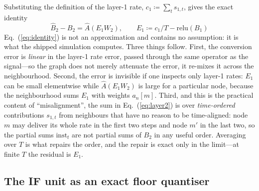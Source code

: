 \documentclass[10pt,twocolumn]{article}
\newcommand{\Ahat}{\hat{A}}
\newcommand{\Bone}{B_{1}}
\newcommand{\Btwo}{B_{2}}
\newcommand{\Btwohat}{\hat{B}_{2}}
\newcommand{\Eone}{E_{1}}
\newcommand{\cntone}{c_{1}}
\newcommand{\eqnref}[1]{Eq.~(\ref{#1})}
\begin{document}
Substituting the definition of the layer-1 rate, $\cntone \coloneqq \sum_{t} s_{1,t}$, gives the
exact identity
\begin{equation}
\boxed{\;\Btwohat - \Btwo = \Ahat\left(\Eone W_{2}\right),
\qquad \Eone \coloneqq \cntone/T - \mathrm{relu}(\Bone)\;}
\label{eq:identity}
\end{equation}
\eqnref{eq:identity} is not an approximation and contains no assumption: it is what the shipped
simulation computes. Three things follow. First, the conversion error is \emph{linear} in the
layer-1 rate error, passed through the same operator as the signal---so the graph does not merely
attenuate the error, it re-mixes it across the neighbourhood. Second, the error is invisible if one
inspects only layer-1 rates: $\Eone$ can be small elementwise while $\Ahat(\Eone W_{2})$ is large for
a particular node, because the neighbourhood sums $\Eone$ with weights $a_{n}[m]$. Third, and this
is the practical content of ``misalignment'', the sum in \eqnref{eq:layer2} is over
\emph{time-ordered} contributions $s_{1,t}$ from neighbours that have no reason to be time-aligned:
node $m$ may deliver its whole rate in the first two steps and node $m'$ in the last two, so the
partial sums $\mathrm{inst}_{t}$ are not partial sums of $\Btwo$ in any useful order. Averaging over
$T$ is what repairs the order, and the repair is exact only in the limit---at finite $T$ the residual
is $\Eone$.

\subsection{The IF unit as an exact floor quantiser}
\label{sec:lemma1}
\end{document}
